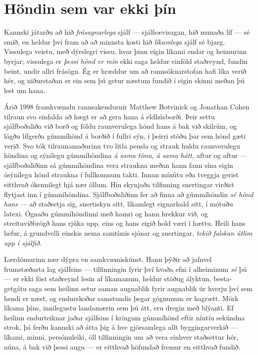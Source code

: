 \section*{Höndin sem var ekki þín}

Kannski játarðu að hið \emph{frásagnarlega} sjálf — sjálfsævisagan, hið munaða líf — sé smíð, en heldur því fram að að minnsta kosti hið \emph{líkamlega} sjálf sé bjarg. Vissulega veistu, með dýrslegri vissu, hvar þinn eigin líkami endar og heimurinn byrjar; vissulega er \emph{þessi hönd er mín} ekki saga heldur einföld staðreynd, fundin beint, undir allri frásögn. Ég er hræddur um að rannsóknarstofan hafi líka verið hér, og niðurstaðan er ein sem þú getur næstum fundið í eigin skinni meðan þú lest um hana.

Árið 1998 framkvæmdu rannsakendurnir Matthew Botvinick og Jonathan Cohen tilraun svo einfalda að hægt er að gera hana á eldhúsborði. Þeir settu sjálfboðaliða við borð og földu raunverulega hönd hans á bak við skilrúm, og lögðu lífgerða gúmmíhönd á borðið í fullri sýn, í þeirri stöðu þar sem hönd gæti verið. Svo tók tilraunamaðurinn tvo litla pensla og strauk huldu raunverulegu höndina og sýnilegu gúmmíhöndina \emph{á sama tíma, á sama hátt,} aftur og aftur — sjálfboðaliðinn sá gúmmíhöndina vera straukna meðan hann fann sína eigin ósýnilegu hönd straukna í fullkomnum takti. Innan mínútu eða tveggja gerist eitthvað ókennilegt hjá nær öllum. Hin skynjaða tilfinning snertingar virðist flytjast inn í gúmmíhöndina. Sjálfboðaliðinn fer að finna að gúmmíhöndin \emph{sé hönd hans} — að staðsetja sig, snertiskyn sitt, líkamlegt eignarhald sitt, í mótuðu latexi. Ógnaðu gúmmíhöndinni með hamri og hann hrekkur við, og streituviðbrögð hans rjúka upp, eins og hans eigið hold væri í hættu. Heili hans hefur, á grundvelli einskis nema samtímis sjónar og snertingar, \emph{tekið falskan útlim upp í sjálfið.}

Lærdómurinn nær dýpra en samkvæmiskúnst. Hann þýðir að jafnvel frumstæðasta lag sjálfsins — tilfinningin fyrir því hvaða efni í alheiminum \emph{sé} þú — er ekki föst staðreynd lesin af líkamanum, heldur stöðug ályktun, besta-getgátu saga sem heilinn setur saman augnablik fyrir augnablik úr hverju því sem hendi er næst, og endurskoðar samstundis þegar gögnunum er hagrætt. Mörk líkama þíns, innilegustu landamærin sem þú átt, eru dregin með blýanti. Ef heilinn endurteiknar jaðar sjálfsins í kringum gúmmíhönd eftir níutíu sekúndna strok, þá ferðu kannski að átta þig á hve gjörsamlega allt byggingarverkið — líkami, minni, persónuleiki, öll tilfinningin um að vera einhver staðsettur hér, núna, á bak við þessi augu — er eitthvað höfundað fremur en eitthvað fundið.

